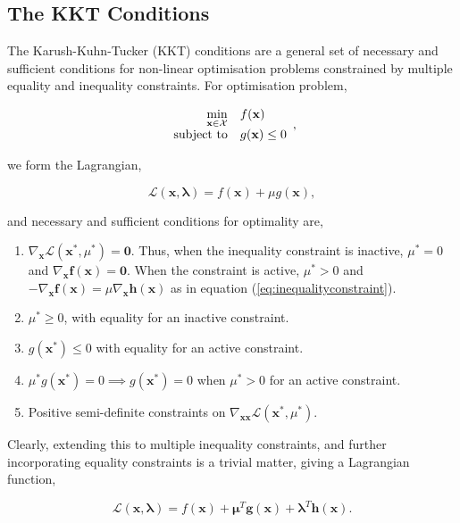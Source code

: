 \documentclass[11pt]{amsart}
\begin{document}
\subsection{The KKT Conditions}

The Karush-Kuhn-Tucker (KKT) conditions are a general set of necessary and sufficient conditions for non-linear optimisation problems constrained by multiple equality and inequality constraints. For optimisation problem,

\begin{align}
\begin{array}{rl}
\displaystyle \min_{\mathbf{x} \in \mathcal{X}} & f(\mathbf{x})\\
\text{subject to} & g(\mathbf{x}) \leq 0
\end{array} \notag,
\end{align}

we form the Lagrangian,

$$\mathcal{L}(\mathbf{x}, \boldsymbol\lambda) = f(\mathbf{x}) + \mu g(\mathbf{x}),$$

and necessary and sufficient conditions for optimality are,

\begin{enumerate}
\item $\nabla_{\mathbf{x}}\mathcal{L}(\mathbf{x}^*, \mu^*) = \mathbf{0}$. Thus, when the inequality constraint is inactive, $\mu^{*} = 0$ and $\nabla_{\mathbf{x}}\mathbf{f}(\mathbf{x}) = \mathbf{0}$. When the constraint is active, $\mu^* > 0$ and $-\nabla_{\mathbf{x}}\mathbf{f}(\mathbf{x}) = \mu\nabla_{\mathbf{x}}\mathbf{h}(\mathbf{x})$ as in equation (\ref{eq:inequalityconstraint}).
\item $\mu^* \geq 0$, with equality for an inactive constraint.
\item $g(\mathbf{x}^*) \leq 0$ with equality for an active constraint.
\item $\mu^*g(\mathbf{x}^*) = 0 \implies g(\mathbf{x}^*) = 0$ when $\mu^* > 0$ for an active constraint.
\item Positive semi-definite constraints on $\nabla_{\mathbf{x}\mathbf{x}}\mathcal{L}(\mathbf{x}^*, \mu^*)$.
\end{enumerate}

Clearly, extending this to multiple inequality constraints, and further incorporating equality constraints is a trivial matter, giving a Lagrangian function,

$$\mathcal{L}(\mathbf{x}, \boldsymbol\lambda) = f(\mathbf{x}) + \boldsymbol\mu^T \mathbf{g}(\mathbf{x}) + \boldsymbol\lambda^T \mathbf{h}(\mathbf{x}).$$
\end{document}
